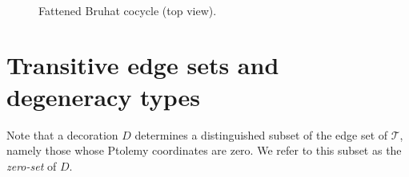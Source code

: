 \documentclass[11pt]{amsart}
\theoremstyle{plain}
\theoremstyle{definition}
\numberwithin{equation}{section}
\newcommand{\T}{\mathcal T}
\begin{document}



\begin{figure}[htb]
\hspace{0.5cm}\begin{minipage}[b]{0.55\textwidth}
\scalebox{1.2}{}
\end{minipage}
\hspace{-1cm}
\begin{minipage}[b]{0.35\textwidth}
\scalebox{0.75}{}
\end{minipage}\\
\begin{minipage}[t]{0.45\textwidth}
\caption{Fattened version of Figure~\ref{fig:EdgeNbh}.}\label{fig:FatEdgeNbh}
\end{minipage}
\hspace{-0.5cm}
\begin{minipage}[t]{0.5\textwidth}
\caption{Fattened Bruhat cocycle (top view).}\label{fig:FatEdgeRelationTop}
\end{minipage}
\end{figure}

\section{Transitive edge sets and degeneracy types}\label{sec:TransitiveEdgeSets}
Note that a decoration $D$ determines a distinguished subset of the edge set of $\T$, namely those whose Ptolemy coordinates are zero. We refer to this subset as the \emph{zero-set} of $D$.

\end{document}
